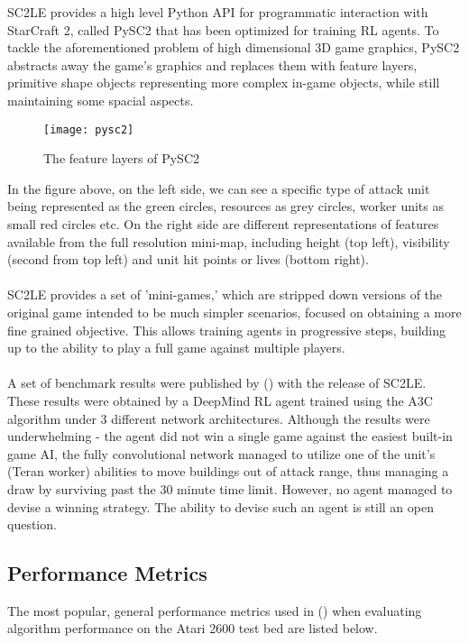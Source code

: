SC2LE provides a high level Python API for programmatic interaction with StarCraft 2, called PySC2 that has been optimized for training RL agents. To tackle the aforementioned problem of high dimensional 3D game graphics, PySC2 abstracts away the game's graphics and replaces them with feature layers, primitive shape objects representing more complex in-game objects, while still maintaining some spacial aspects.

\begin{figure}[H]
    \centering
    \texttt{[image: pysc2]}
    \caption{The feature layers of PySC2}
\end{figure}

In the figure above, on the left side, we can see a specific type of attack unit being represented as the green circles, resources as grey circles, worker units as small red circles etc. On the right side are different representations of features available from the full resolution mini-map, including height (top left), visibility (second from top left) and unit hit points or lives (bottom right). \paragraph{}

SC2LE provides a set of 'mini-games,' which are stripped down versions of the original game intended to be much simpler scenarios, focused on obtaining a more fine grained objective. This allows training agents in progressive steps, building up to the ability to play a full game against multiple players. \paragraph{}

A set of benchmark results were published by (\citet{starcraft}) with the release of SC2LE. These results were obtained by a DeepMind RL agent trained using the A3C algorithm under 3 different network architectures. Although the results were underwhelming - the agent did not win a single game against the easiest built-in game AI, the fully convolutional network managed to utilize one of the unit's (Teran worker) abilities to move buildings out of attack range, thus managing a draw by surviving past the 30 minute time limit. However, no agent managed to devise a winning strategy. The ability to devise such an agent is still an open question.

\subsection{Performance Metrics}
The most popular, general performance metrics used in (\citet{doubleq,dueling,deepmind1,human,a3c}) when evaluating algorithm performance on the Atari 2600 test bed are listed below.


